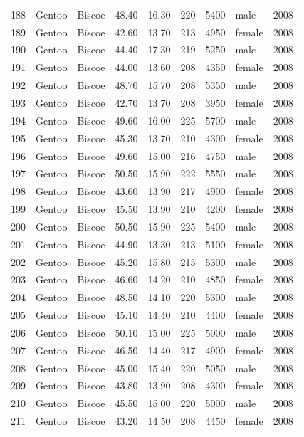 \documentclass{article}\usepackage[]{graphicx}\usepackage[]{xcolor}
\begin{document}
\begin{table}[ht]
\begin{tabular}{rllrrrrlr}
  188 & Gentoo & Biscoe & 48.40 & 16.30 & 220 & 5400 & male & 2008 \\ 
  189 & Gentoo & Biscoe & 42.60 & 13.70 & 213 & 4950 & female & 2008 \\ 
  190 & Gentoo & Biscoe & 44.40 & 17.30 & 219 & 5250 & male & 2008 \\ 
  191 & Gentoo & Biscoe & 44.00 & 13.60 & 208 & 4350 & female & 2008 \\ 
  192 & Gentoo & Biscoe & 48.70 & 15.70 & 208 & 5350 & male & 2008 \\ 
  193 & Gentoo & Biscoe & 42.70 & 13.70 & 208 & 3950 & female & 2008 \\ 
  194 & Gentoo & Biscoe & 49.60 & 16.00 & 225 & 5700 & male & 2008 \\ 
  195 & Gentoo & Biscoe & 45.30 & 13.70 & 210 & 4300 & female & 2008 \\ 
  196 & Gentoo & Biscoe & 49.60 & 15.00 & 216 & 4750 & male & 2008 \\ 
  197 & Gentoo & Biscoe & 50.50 & 15.90 & 222 & 5550 & male & 2008 \\ 
  198 & Gentoo & Biscoe & 43.60 & 13.90 & 217 & 4900 & female & 2008 \\ 
  199 & Gentoo & Biscoe & 45.50 & 13.90 & 210 & 4200 & female & 2008 \\ 
  200 & Gentoo & Biscoe & 50.50 & 15.90 & 225 & 5400 & male & 2008 \\ 
  201 & Gentoo & Biscoe & 44.90 & 13.30 & 213 & 5100 & female & 2008 \\ 
  202 & Gentoo & Biscoe & 45.20 & 15.80 & 215 & 5300 & male & 2008 \\ 
  203 & Gentoo & Biscoe & 46.60 & 14.20 & 210 & 4850 & female & 2008 \\ 
  204 & Gentoo & Biscoe & 48.50 & 14.10 & 220 & 5300 & male & 2008 \\ 
  205 & Gentoo & Biscoe & 45.10 & 14.40 & 210 & 4400 & female & 2008 \\ 
  206 & Gentoo & Biscoe & 50.10 & 15.00 & 225 & 5000 & male & 2008 \\ 
  207 & Gentoo & Biscoe & 46.50 & 14.40 & 217 & 4900 & female & 2008 \\ 
  208 & Gentoo & Biscoe & 45.00 & 15.40 & 220 & 5050 & male & 2008 \\ 
  209 & Gentoo & Biscoe & 43.80 & 13.90 & 208 & 4300 & female & 2008 \\ 
  210 & Gentoo & Biscoe & 45.50 & 15.00 & 220 & 5000 & male & 2008 \\ 
  211 & Gentoo & Biscoe & 43.20 & 14.50 & 208 & 4450 & female & 2008 \\ 

\end{tabular}
\end{table}
\end{document}
